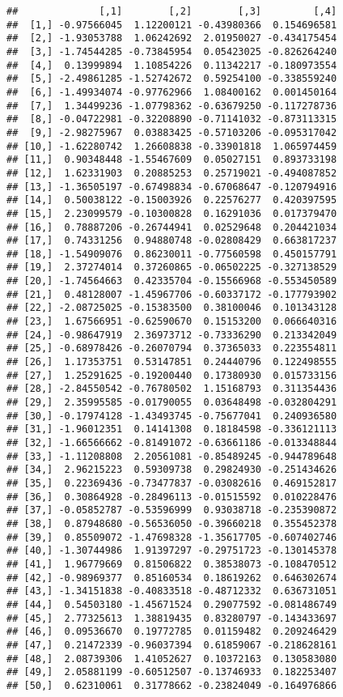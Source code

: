 \documentclass[]{article}
\begin{document}
\begin{verbatim}
##              [,1]        [,2]        [,3]         [,4]
##  [1,] -0.97566045  1.12200121 -0.43980366  0.154696581
##  [2,] -1.93053788  1.06242692  2.01950027 -0.434175454
##  [3,] -1.74544285 -0.73845954  0.05423025 -0.826264240
##  [4,]  0.13999894  1.10854226  0.11342217 -0.180973554
##  [5,] -2.49861285 -1.52742672  0.59254100 -0.338559240
##  [6,] -1.49934074 -0.97762966  1.08400162  0.001450164
##  [7,]  1.34499236 -1.07798362 -0.63679250 -0.117278736
##  [8,] -0.04722981 -0.32208890 -0.71141032 -0.873113315
##  [9,] -2.98275967  0.03883425 -0.57103206 -0.095317042
## [10,] -1.62280742  1.26608838 -0.33901818  1.065974459
## [11,]  0.90348448 -1.55467609  0.05027151  0.893733198
## [12,]  1.62331903  0.20885253  0.25719021 -0.494087852
## [13,] -1.36505197 -0.67498834 -0.67068647 -0.120794916
## [14,]  0.50038122 -0.15003926  0.22576277  0.420397595
## [15,]  2.23099579 -0.10300828  0.16291036  0.017379470
## [16,]  0.78887206 -0.26744941  0.02529648  0.204421034
## [17,]  0.74331256  0.94880748 -0.02808429  0.663817237
## [18,] -1.54909076  0.86230011 -0.77560598  0.450157791
## [19,]  2.37274014  0.37260865 -0.06502225 -0.327138529
## [20,] -1.74564663  0.42335704 -0.15566968 -0.553450589
## [21,]  0.48128007 -1.45967706 -0.60337172 -0.177793902
## [22,] -2.08725025 -0.15383500  0.38100046  0.101343128
## [23,]  1.67566951 -0.62590670  0.15153200  0.066640316
## [24,] -0.98647919  2.36973712 -0.73336290  0.213342049
## [25,] -0.68978426 -0.26070794  0.37365033  0.223554811
## [26,]  1.17353751  0.53147851  0.24440796  0.122498555
## [27,]  1.25291625 -0.19200440  0.17380930  0.015733156
## [28,] -2.84550542 -0.76780502  1.15168793  0.311354436
## [29,]  2.35995585 -0.01790055  0.03648498 -0.032804291
## [30,] -0.17974128 -1.43493745 -0.75677041  0.240936580
## [31,] -1.96012351  0.14141308  0.18184598 -0.336121113
## [32,] -1.66566662 -0.81491072 -0.63661186 -0.013348844
## [33,] -1.11208808  2.20561081 -0.85489245 -0.944789648
## [34,]  2.96215223  0.59309738  0.29824930 -0.251434626
## [35,]  0.22369436 -0.73477837 -0.03082616  0.469152817
## [36,]  0.30864928 -0.28496113 -0.01515592  0.010228476
## [37,] -0.05852787 -0.53596999  0.93038718 -0.235390872
## [38,]  0.87948680 -0.56536050 -0.39660218  0.355452378
## [39,]  0.85509072 -1.47698328 -1.35617705 -0.607402746
## [40,] -1.30744986  1.91397297 -0.29751723 -0.130145378
## [41,]  1.96779669  0.81506822  0.38538073 -0.108470512
## [42,] -0.98969377  0.85160534  0.18619262  0.646302674
## [43,] -1.34151838 -0.40833518 -0.48712332  0.636731051
## [44,]  0.54503180 -1.45671524  0.29077592 -0.081486749
## [45,]  2.77325613  1.38819435  0.83280797 -0.143433697
## [46,]  0.09536670  0.19772785  0.01159482  0.209246429
## [47,]  0.21472339 -0.96037394  0.61859067 -0.218628161
## [48,]  2.08739306  1.41052627  0.10372163  0.130583080
## [49,]  2.05881199 -0.60512507 -0.13746933  0.182253407
## [50,]  0.62310061  0.31778662 -0.23824049 -0.164976866
\end{verbatim}
\end{document}
